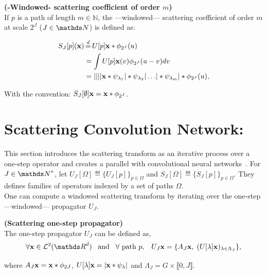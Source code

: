 \documentclass[a4paper,11pt]{report}
\begin{document}
      \begin{defn} \textbf{(-Windowed- scattering coefficient of order $m$)}\\
				If $p$ is a path of length $m \in \mathds{N}$, the ---windowed--- scattering coefficient of order $m$ at scale $2^{J}$ ($J \in \dsN$) is defined as:
				
				\begin{equation}
					\label{eq:ST windowed}
					\begin{split}
						S_{J}[p](\bfx) &\eqdef U[p]\bfx \ast \phi_{2^{J}}(u) \\
									&= \int U[p]\bfx(v) \phi_{2^{J}}(u-v) dv \\
									&= \abs{\abs{\abs{\abs{\bfx \ast \psi_{\lambda_{1}}} \ast \psi_{\lambda_{2}}} 
							\dots } \ast \psi_{\lambda_{m}}} \ast \phi_{2^{J}}(u),
					\end{split}
				\end{equation}
				
				With the convention: $S_{J}[\emptyset]{\bf x} = {\bf x} \ast \phi_{2^{J}}$.\\
      	\label{def:SC windozed}
      \end{defn}

		\section{Scattering Convolution Network:}
			\label{sec:ST/SCN}
			
			This section introduces the scattering transform as an iterative process over a one-step operator and creates a parallel with convolutional neural networks~\citep{lecun2010convolutional}. For $J \in \dsN^{\ast}$, let $U_{J}[\Omega] \eqdef \{U_{J}[p]\}_{p \in \Omega}$ and $S_{J}[\Omega] \eqdef \{S_{J}[p]\}_{p \in \Omega}$. They defines families of operators indexed by a set of paths $\Omega$.\\
			
			One can compute a windowed scattering transform by iterating over the one-step ---windowed--- propagator $U_{J}$.
			
			\begin{defn}  \textbf{(Scattering one-step propagator)}\\
				The one-step propagator $U_{J}$ can be defined as,
				\begin{equation}
					\forall \bfx \in \mcalL^{2}(\dsR^{d}) \;\;\; \text{and} \;\;\; \forall \text{ path } p, \;\;\;
					U_{J} \bfx = \{ A_{J}\bfx , \; (U[\lambda]\bfx)_{\lambda \in \Lambda_{J}} \},
					\label{eq:One step propagator}
				\end{equation}
				
				where $A_{J}{\bf x} = {\bf x} \ast \phi_{2J}$, $U[\lambda]{\bf x} = \left| {\bf x} \ast \psi_{\lambda} \right|$ and $\Lambda_{J} = G \times \llbracket0, J \rrbracket$.\\
				\label{def:One step propagator}
			\end{defn}
			
\end{document}
